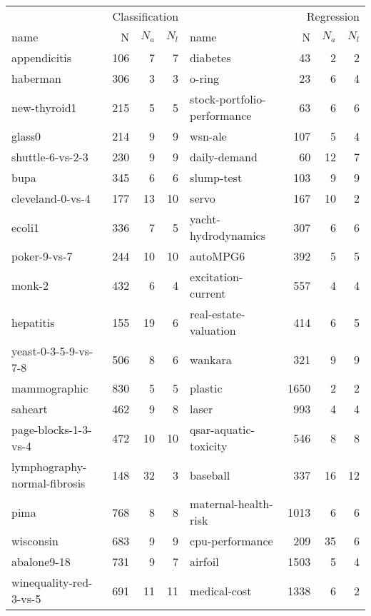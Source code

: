 \begin{tabular}{lrrrlrrr}
\toprule
\multicolumn{4}{r}{Classification} & \multicolumn{4}{r}{Regression} \\
name & N & $N_a$ & $N_l$ & name & N & $N_a$ & $N_l$ \\
\midrule
appendicitis \cite{keel} & 106 & 7 & 7 & diabetes \cite{keel} & 43 & 2 & 2 \\
haberman \cite{keel} & 306 & 3 & 3 & o-ring \cite{uci} & 23 & 6 & 4 \\
new-thyroid1 \cite{keel} & 215 & 5 & 5 & stock-portfolio-performance \cite{uci} & 63 & 6 & 6 \\
glass0 \cite{keel} & 214 & 9 & 9 & wsn-ale \cite{uci} & 107 & 5 & 4 \\
shuttle-6-vs-2-3 \cite{keel} & 230 & 9 & 9 & daily-demand \cite{uci} & 60 & 12 & 7 \\
bupa \cite{keel} & 345 & 6 & 6 & slump-test \cite{krnn} & 103 & 9 & 9 \\
cleveland-0-vs-4 \cite{keel} & 177 & 13 & 10 & servo \cite{uci} & 167 & 10 & 2 \\
ecoli1 \cite{keel} & 336 & 7 & 5 & yacht-hydrodynamics \cite{krnn} & 307 & 6 & 6 \\
poker-9-vs-7 \cite{keel} & 244 & 10 & 10 & autoMPG6 \cite{keel} & 392 & 5 & 5 \\
monk-2 \cite{keel} & 432 & 6 & 4 & excitation-current \cite{uci} & 557 & 4 & 4 \\
hepatitis \cite{krnn} & 155 & 19 & 6 & real-estate-valuation \cite{uci} & 414 & 6 & 5 \\
yeast-0-3-5-9-vs-7-8 \cite{keel} & 506 & 8 & 6 & wankara \cite{keel} & 321 & 9 & 9 \\
mammographic \cite{keel} & 830 & 5 & 5 & plastic \cite{keel} & 1650 & 2 & 2 \\
saheart \cite{keel} & 462 & 9 & 8 & laser \cite{keel} & 993 & 4 & 4 \\
page-blocks-1-3-vs-4 \cite{keel} & 472 & 10 & 10 & qsar-aquatic-toxicity \cite{uci} & 546 & 8 & 8 \\
lymphography-normal-fibrosis \cite{keel} & 148 & 32 & 3 & baseball \cite{keel} & 337 & 16 & 12 \\
pima \cite{keel} & 768 & 8 & 8 & maternal-health-risk \cite{uci} & 1013 & 6 & 6 \\
wisconsin \cite{keel} & 683 & 9 & 9 & cpu-performance \cite{krnn} & 209 & 35 & 6 \\
abalone9-18 \cite{keel} & 731 & 9 & 7 & airfoil \cite{krnn} & 1503 & 5 & 4 \\
winequality-red-3-vs-5 \cite{keel} & 691 & 11 & 11 & medical-cost \cite{mlwithr} & 1338 & 6 & 2 \\
\bottomrule
\end{tabular}
